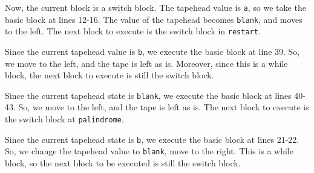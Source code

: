 \noindent Now, the current block is a switch block. The tapehead value is \texttt{a}, so we take the basic block at lines 12-16. The value of the tapehead becomes \texttt{blank}, and moves to the left. The next block to execute is the switch block in \texttt{restart}.
\begin{figure}[H]
    \centering
\end{figure}
\noindent Since the current tapehead value is \texttt{b}, we execute the basic block at line 39. So, we move to the left, and the tape is left as is. Moreover, since this is a while block, the next block to execute is still the switch block.
\begin{figure}[H]
    \centering
\end{figure}
\noindent Since the current tapehead state is \texttt{blank}, we execute the basic block at lines 40-43. So, we move to the left, and the tape is left as is. The next block to execute is the switch block at \texttt{palindrome}.
\begin{figure}[H]
    \centering
\end{figure}
\noindent Since the current tapehead state is \texttt{b}, we execute the basic block at lines 21-22. So, we change the tapehead value to \texttt{blank}, move to the right. This is a while block, so the next block to be executed is still the switch block.
